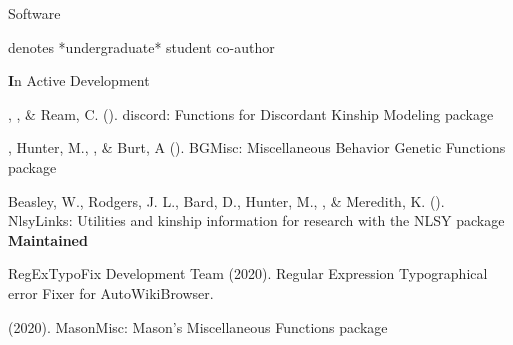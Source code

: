 \begin{rSection}{\textrm{Software}}%
\vspace{-1mm}\begin{center}\footnotesize{denotes *undergraduate* student co-author}\end{center}\vspace{-5mm}
{\large \textbf In Active Development}%
\begin{etaremune}
\item\meb, \jt, \& Ream, C. (\the\year). discord: Functions for Discordant Kinship Modeling \R package 
%
\item\meb, Hunter, M., \jt, \& Burt, A (\the\year). BGMisc: Miscellaneous Behavior Genetic Functions \R package %
%
%
\item  Beasley, W., Rodgers, J. L., Bard, D., Hunter, M., \meb, \& Meredith, K. (\the\year). NlsyLinks: Utilities and kinship information for research with the NLSY \R package \smallskip\\
%
\hspace*{-8mm}\large{\bf{Maintained}}

\item RegExTypoFix Development Team (2020). Regular Expression Typographical error Fixer for AutoWikiBrowser. 
%
\item\meb (2020). MasonMisc: Mason's Miscellaneous Functions \R package 
%
%
\end{etaremune}
\end{rSection}